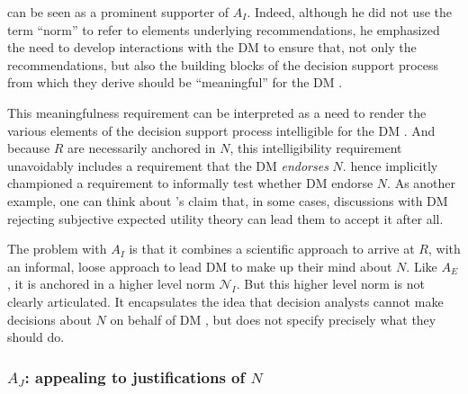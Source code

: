 \documentclass[preprint, french, english, 11pt, authoryear]{elsarticle}%
\newcommand{\protectforpdf}[1]{\texorpdfstring{\ensuremath{#1}}{#1}}
\newcommand{\possessivecite}[1]{\citeauthor{#1}’s \citeyearpar{#1}}
\begin{document}
\citet{roy_multicriteria_1996} can be seen as a prominent supporter of $A_I$. 
Indeed, although he did not use the term “norm” to refer to elements underlying recommendations, he emphasized the need to develop interactions with the DM%
 to ensure that, not only the recommendations, 
but also the building blocks of the decision support process from which they derive should be ``meaningful'' for the DM%
.

This meaningfulness requirement can be interpreted as a need to render the various elements of the decision support process intelligible for the DM%
.
And because $R$ are necessarily anchored in $N$, this intelligibility requirement unavoidably includes a requirement that the DM%
 \emph{endorses} $N$. 
\citet{roy_multicriteria_1996} hence implicitly championed a requirement to informally test whether DM%
 endorse $N$. 
As another example, one can think about \possessivecite{raiffa_back_1985} claim that, in some cases, discussions with DM%
 rejecting subjective expected utility theory can lead them to accept it after all.

The problem with $A_I$ is that it combines a scientific approach to arrive at $R$, with an informal, loose approach to lead DM%
 to make up their mind about $N$.
Like $A_E$, it is anchored in a higher level norm $\mathscr{N}_I$. But this higher level norm is not clearly articulated. It encapsulates the idea that decision analysts cannot make decisions about $N$ on behalf of DM%
, but does not specify precisely what they should do.



\subsubsection{\texorpdfstring{$A_J$}{AJ}: appealing to justifications of \protectforpdf{N}}
\end{document}

